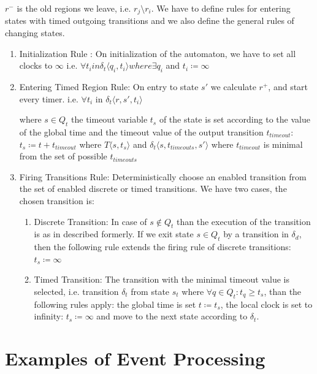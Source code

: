 			$r^-$ is the old regions we leave, i.e. $ r_j \setminus r_i $.
			We have to define rules for entering states with timed outgoing transitions and we also define the general rules of changing states. 
			\begin{enumerate}
				\item Initialization Rule : On initialization of the automaton, we have to set all clocks to $\infty$ 
					i.e. $\forall t_i in \delta_t \langle q_i, t_i \rangle where \exists q_i$ and $t_i \coloneqq \infty $
			
				\item Entering Timed Region Rule: On entry to state $s'$ we calculate $r^+$, and start every timer.
					i.e. $\forall t_i$ in $\delta_t\langle r, s', t_i \rangle$  
				
				
					where $s \in Q_t$ the timeout variable $t_s$ of the state is set according to the value of the global time and the timeout value of the output transition $t_{timeout}$:
					$t_s\coloneqq t+t_{timeout}$ %
					where $T\langle s,t_s \rangle$ and $\delta_t\langle s,t_{timeouts},s' \rangle$ where $t_{timeout}$ is minimal from the set of possible $t_{timeouts}$ 
				
				\item Firing Transitions Rule: Deterministically choose an enabled transition from the set of enabled discrete or timed transitions. We have two cases, the chosen transition is:
					\begin{enumerate}
						\item Discrete Transition: In case of $s \notin Q_t$ than the execution of the transition is as in described formerly. If we exit state $s \in Q_t$ by a transition in $\delta_d$, 
						then the following rule extends the firing rule of discrete transitions:
							$t_s \coloneqq \infty$
						\item Timed Transition: The transition with the minimal timeout value is selected, i.e. transition $\delta_t$ from state $s_t$ where $\forall q \in Q_t: t_q \geq t_s$, than the following rules apply:
						 the global time is set $t \coloneqq t_s$, the local clock is set to infinity: $t_s \coloneqq \infty$ and move to the next state according to $\delta_t$.
					\end{enumerate}			
			\end{enumerate}
				
	\section{Examples of Event Processing}
 
